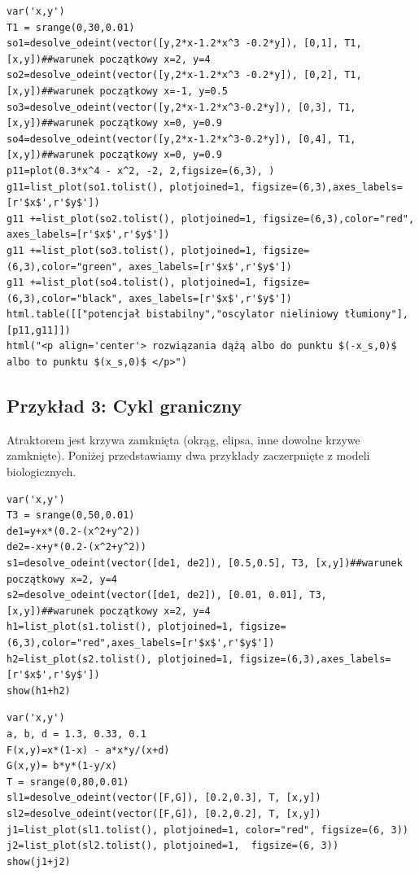 \documentclass[a4paper,12pt,polish]{sphinxmanual}
\begin{document}
\begin{verbatim}
var('x,y')
T1 = srange(0,30,0.01)
so1=desolve_odeint(vector([y,2*x-1.2*x^3 -0.2*y]), [0,1], T1, [x,y])##warunek początkowy x=2, y=4
so2=desolve_odeint(vector([y,2*x-1.2*x^3 -0.2*y]), [0,2], T1, [x,y])##warunek początkowy x=-1, y=0.5
so3=desolve_odeint(vector([y,2*x-1.2*x^3-0.2*y]), [0,3], T1, [x,y])##warunek początkowy x=0, y=0.9
so4=desolve_odeint(vector([y,2*x-1.2*x^3-0.2*y]), [0,4], T1, [x,y])##warunek początkowy x=0, y=0.9
p11=plot(0.3*x^4 - x^2, -2, 2,figsize=(6,3), )
g11=list_plot(so1.tolist(), plotjoined=1, figsize=(6,3),axes_labels=[r'$x$',r'$y$'])
g11 +=list_plot(so2.tolist(), plotjoined=1, figsize=(6,3),color="red", axes_labels=[r'$x$',r'$y$'])
g11 +=list_plot(so3.tolist(), plotjoined=1, figsize=(6,3),color="green", axes_labels=[r'$x$',r'$y$'])
g11 +=list_plot(so4.tolist(), plotjoined=1, figsize=(6,3),color="black", axes_labels=[r'$x$',r'$y$'])
html.table([["potencjał bistabilny","oscylator nieliniowy tłumiony"],[p11,g11]])
html("<p align='center'> rozwiązania dążą albo do punktu $(-x_s,0)$ albo to punktu $(x_s,0)$ </p>")
\end{verbatim}



\subsection{Przykład 3: Cykl graniczny}
\label{ch1/chI024:przyklad-3-cykl-graniczny}
Atraktorem jest krzywa zamknięta (okrąg, elipsa, inne dowolne krzywe zamknięte).  Poniżej przedstawiamy dwa przykłady zaczerpnięte z modeli biologicznych.


\begin{verbatim}
var('x,y')
T3 = srange(0,50,0.01)
de1=y+x*(0.2-(x^2+y^2))
de2=-x+y*(0.2-(x^2+y^2))
s1=desolve_odeint(vector([de1, de2]), [0.5,0.5], T3, [x,y])##warunek początkowy x=2, y=4
s2=desolve_odeint(vector([de1, de2]), [0.01, 0.01], T3, [x,y])##warunek początkowy x=2, y=4
h1=list_plot(s1.tolist(), plotjoined=1, figsize=(6,3),color="red",axes_labels=[r'$x$',r'$y$'])
h2=list_plot(s2.tolist(), plotjoined=1, figsize=(6,3),axes_labels=[r'$x$',r'$y$'])
show(h1+h2)
\end{verbatim}



\begin{verbatim}
var('x,y')
a, b, d = 1.3, 0.33, 0.1
F(x,y)=x*(1-x) - a*x*y/(x+d)
G(x,y)= b*y*(1-y/x)
T = srange(0,80,0.01)
sl1=desolve_odeint(vector([F,G]), [0.2,0.3], T, [x,y])
sl2=desolve_odeint(vector([F,G]), [0.2,0.2], T, [x,y])
j1=list_plot(sl1.tolist(), plotjoined=1, color="red", figsize=(6, 3))
j2=list_plot(sl2.tolist(), plotjoined=1,  figsize=(6, 3))
show(j1+j2)
\end{verbatim}
\end{document}
